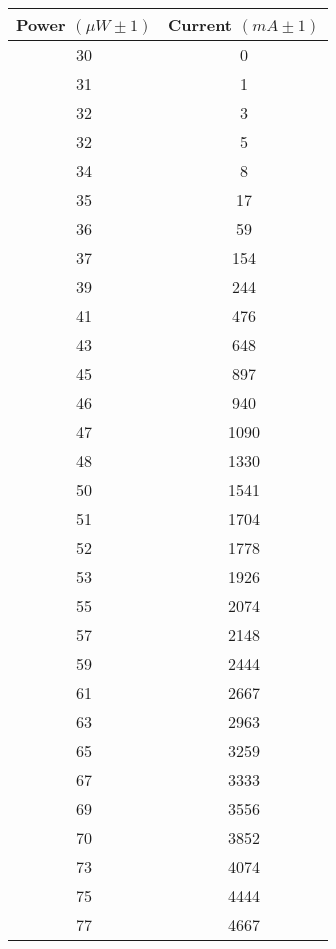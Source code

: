 \documentclass[openany,11pt,a4paper]{book}
\begin{document}
\begin{center}
    \begin{tabular}{| c | c |}
    \hline
    Power $(\mu W \pm 1)$ & Current $(mA \pm 1)$ \\ \hline
    30 & 0 \\ \hline
    31 & 1 \\ \hline
    32 & 3 \\ \hline
    32 & 5  \\ \hline
    34 & 8  \\ \hline
    35 & 17  \\ \hline
    36 & 59  \\ \hline
    37 & 154  \\ \hline
    39 & 244  \\ \hline
    41 & 476  \\ \hline
    43 & 648  \\ \hline
    45 & 897  \\ \hline
    46 & 940  \\ \hline
    47 & 1090  \\ \hline
    48 & 1330 \\ \hline
    50 & 1541  \\ \hline
    51 & 1704  \\ \hline
    52 & 1778  \\ \hline
    53 & 1926  \\ \hline
    55 & 2074  \\ \hline
     57 & 2148  \\ \hline
     59  & 2444  \\ \hline
     61 & 2667  \\ \hline
     63 &  2963  \\ \hline
     65 & 3259  \\ \hline
     67 & 3333  \\ \hline
     69 & 3556  \\ \hline
     70 & 3852  \\ \hline
     73 & 4074  \\ \hline
     75 & 4444  \\ \hline
     77 & 4667  \\ \hline
                
    \end{tabular}
\end{center}

\end{document}
